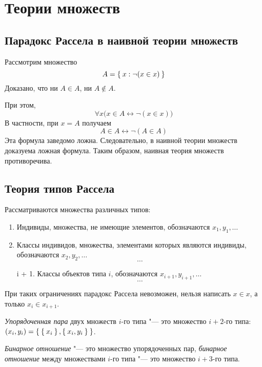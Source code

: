 \section*{Теории множеств}

\subsection*{Парадокс Рассела в наивной теории множеств}

Рассмотрим множество
$$ A = \Set{x : \neg (x \in x)} $$
Доказано, что ни $ A \in A $, ни $ A \not\in A $.

При этом,
$$ \forall x \bigl( x \in A \leftrightarrow \neg (x \in x) \bigr) $$
В частности, при $ x = A $ получаем
$$ A \in A \leftrightarrow \neg (A \in A) $$
Эта формула заведомо ложна. Следовательно, в наивной теории множеств доказуема ложная формула.
Таким образом, наивная теория множеств противоречива.

\subsection*{Теория типов Рассела}

Рассматриваются множества различных типов:
\begin{enumerate}
	\item Индивиды, \ie множества, не имеющие элементов, обозначаются $ x_1, y_1, \dots $
	\item Классы индивидов, \ie множества, элементами которых являются индивиды, обозначаются $ x_2, y_2, \dots $
		$$ \dots $$
	\item[i + 1.] Классы объектов типа $ i $, обозначаются $ x_{i + 1}, y_{i + 1}, \dots $
		$$ \dots $$
\end{enumerate}

При таких ограничениях парадокс Рассела невозможен, \as нельзя написать $ x \in x $, а только $ x_i \in x_{i + 1} $.

\begin{definition}
	\emph{Упорядоченная пара} двух множеств $ i $-го типа "--- это множество $ i + 2 $-го типа: $ (x_i, y_i) = \Set{\Set{x_i}, \Set{x_i, y_i}} $.
\end{definition}

\begin{definition}
	\emph{Бинарное отношение} "--- это множество упорядоченных пар, \ie \emph{бинарное отношение} между множествами $ i $-го типа "--- это множество $ i + 3 $-го типа.
\end{definition}

